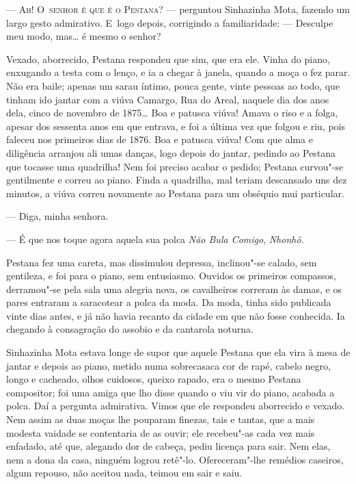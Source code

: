 \begin{linenumbers}

\textsc{--- Ah! O~senhor é que é o Pestana?} --- perguntou Sinhazinha Mota, fazendo
um largo gesto admirativo. E~logo depois, corrigindo a familiaridade: ---
Desculpe meu modo, mas\ldots{} é mesmo o senhor?

Vexado, aborrecido, Pestana respondeu que sim, que era ele. Vinha do
piano, enxugando a testa com o lenço, e ia a chegar à janela, quando a
moça o fez parar. Não era baile; apenas um sarau íntimo, pouca gente,
vinte pessoas ao todo, que tinham ido jantar com a viúva Camargo, Rua do
Areal, naquele dia dos anos dela, cinco de novembro de 1875\ldots{} Boa e
patusca viúva! Amava o riso e a folga, apesar dos sessenta anos em que
entrava, e foi a última vez que folgou e riu, pois faleceu nos primeiros
dias de 1876. Boa e patusca viúva! Com que alma e diligência arranjou
ali umas danças, logo depois do jantar, pedindo ao Pestana que tocasse
uma quadrilha! Nem foi preciso acabar o pedido; Pestana curvou"-se
gentilmente e correu ao piano. Finda a quadrilha, mal teriam descansado
uns dez minutos, a viúva correu novamente ao Pestana para um obséquio
mui particular.

--- Diga, minha senhora.

--- É que nos toque agora aquela sua polca \emph{Não Bula Comigo},
\emph{Nhonhô.}

Pestana fez uma careta, mas dissimulou depressa, inclinou"-se calado, sem
gentileza, e foi para o piano, sem entusiasmo. Ouvidos os primeiros
compassos, derramou"-se pela sala uma alegria nova, os cavalheiros
correram às damas, e os pares entraram a saracotear a polca da moda. Da
moda, tinha sido publicada vinte dias antes, e já não havia recanto da
cidade em que não fosse conhecida. Ia chegando à consagração do assobio
e da cantarola noturna.

Sinhazinha Mota estava longe de supor que aquele Pestana que ela vira à
mesa de jantar e depois ao piano, metido numa sobrecasaca cor de rapé,
cabelo negro, longo e cacheado, olhos cuidosos, queixo rapado, era o
mesmo Pestana compositor; foi uma amiga que lho disse quando o viu vir
do piano, acabada a polca. Daí a pergunta admirativa. Vimos que ele
respondeu aborrecido e vexado. Nem assim as duas moças lhe pouparam
finezas, tais e tantas, que a mais modesta vaidade se contentaria de as
ouvir; ele recebeu"-as cada vez mais enfadado, até que, alegando dor de
cabeça, pediu licença para sair. Nem elas, nem a dona da casa, ninguém
logrou retê"-lo. Ofereceram"-lhe remédios caseiros, algum repouso, não
aceitou nada, teimou em sair e saiu.


\end{linenumbers}
